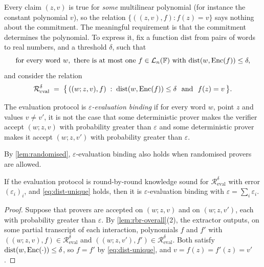 Every claim $(z,v)$ is true for \emph{some} multilinear polynomial (for instance the constant polynomial $v$), so the relation $\{((z,v), f) : f(z) = v\}$ says nothing about the commitment.
The meaningful requirement is that the commitment determines the polynomial.
To express it, fix a function $\mathrm{dist}$ from pairs of words to real numbers, and a threshold $\delta$, such that
\begin{equation}\label{eq:dist-unique}
  \text{for every word } w, \text{ there is at most one } f \in \mathcal{L}_n(\mathbb{F}) \text{ with } \mathrm{dist}(w, \mathrm{Enc}(f)) \le \delta,
\end{equation}
and consider the relation
\[
  \mathcal{R}^{\delta}_{\mathrm{eval}} \;=\; \bigl\{\, ((w; z,v), f) \;:\; \mathrm{dist}(w, \Enc(f)) \le \delta \ \text{ and } \ f(z) = v \,\bigr\}.
\]

\begin{definition}\label{def:binding}
The evaluation protocol is \emph{$\varepsilon$-evaluation binding} if for every word $w$, point $z$ and values $v \ne v'$, it is not the case that some deterministic prover makes the verifier accept $(w; z, v)$ with probability greater than $\varepsilon$ and some deterministic prover makes it accept $(w; z, v')$ with probability greater than $\varepsilon$.
\end{definition}

By \cref{lem:randomised}, $\varepsilon$-evaluation binding also holds when randomised provers are allowed.

\begin{lemma}\label{lem:rbr-binding}
If the evaluation protocol is round-by-round knowledge sound for $\mathcal{R}^{\delta}_{\mathrm{eval}}$ with error $(\varepsilon_i)_i$, and \eqref{eq:dist-unique} holds, then it is $\varepsilon$-evaluation binding with $\varepsilon = \sum_i \varepsilon_i$.
\end{lemma}

\begin{proof}
Suppose that provers are accepted on $(w; z,v)$ and on $(w;z,v')$, each with probability greater than $\varepsilon$.
By \cref{lem:rbr-overall}(2), the extractor outputs, on some partial transcript of each interaction, polynomials $f$ and $f'$ with $((w;z,v),f) \in \mathcal{R}^{\delta}_{\mathrm{eval}}$ and $((w;z,v'),f') \in \mathcal{R}^{\delta}_{\mathrm{eval}}$.
Both satisfy $\mathrm{dist}(w, \mathrm{Enc}(\cdot)) \le \delta$, so $f = f'$ by \eqref{eq:dist-unique}, and $v = f(z) = f'(z) = v'$.
\end{proof}

